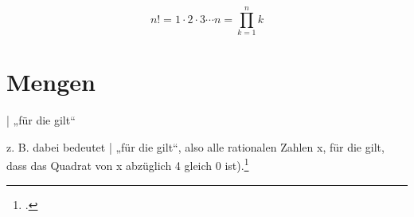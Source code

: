 \documentclass{lehramt-informatik-haupt}
\begin{document}
\begin{displaymath}
n! = 1\cdot 2 \cdot 3 \dotsm n = \prod_{k=1}^n k
\end{displaymath}

\section{Mengen}

| „für die gilt“

z. B. 
dabei bedeutet | „für die gilt“, also alle rationalen
Zahlen x, für die gilt, dass das Quadrat von x abzüglich 4 gleich 0
ist).\footcite[Seite 8]{foerster}

\literatur
\end{document}
